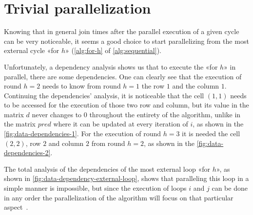 \section{Trivial parallelization}\label{trivial_parallelization}

Knowing that in general join times after the parallel execution of a given cycle can be very noticeable, it seems a good choice to start parallelizing from the most external cycle «for \(h\)» (\cref{alg:for-h} of \cref{alg:sequential}).

Unfortunately, a dependency analysis shows us that to execute the «for \(h\)»  in parallel, there are some dependencies. One can clearly see that the execution of round \(h=2\) needs to know from round \(h=1\) the row \(1\) and the column \(1\). Continuing the dependencies' analysis, it is noticeable that the cell \((1,1)\) needs to be accessed for the execution of those two row and column, but its value in the matrix \(d\) never changes to \(0\) throughout the entirety of the algorithm, unlike in the matrix \(pred\) where it can be updated at every iteration of \( i\), as shown in the \cref{fig:data-dependencies-1}.
For the execution of round \(h=3\) it is needed the cell \((2,2)\), row \(2\) and column \(2\) from round \(h=2\), as shown in the \cref{fig:data-dependencies-2}.

The total analysis of the dependencies of the most external loop «for \(h\)», as shown in \cref{fig:data-dependency-external-loop}, shows that paralleling this loop in a simple manner is impossible, but since the execution of loops \(i\) and \(j\) can be done in any order the parallelization of the algorithm will focus on that particular aspect~\cite{rucci}.

